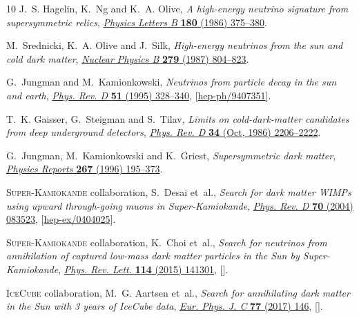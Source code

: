 \documentclass[11pt]{article}
\begin{document}
\begin{thebibliography}{10}
J.~S. Hagelin, K.~Ng and K.~A. Olive, \emph{A high-energy neutrino signature
  from supersymmetric relics},
  \href{https://doi.org/https://doi.org/10.1016/0370-2693(86)91205-0}{\emph{Physics
  Letters B} {\bfseries 180} (1986) 375--380}.

M.~Srednicki, K.~A. Olive and J.~Silk, \emph{High-energy neutrinos from the sun
  and cold dark matter},
  \href{https://doi.org/https://doi.org/10.1016/0550-3213(87)90020-4}{\emph{Nuclear
  Physics B} {\bfseries 279} (1987) 804--823}.

G.~Jungman and M.~Kamionkowski, \emph{{Neutrinos from particle decay in the sun
  and earth}}, \href{https://doi.org/10.1103/PhysRevD.51.328}{\emph{Phys. Rev.
  D} {\bfseries 51} (1995) 328--340},
  [\href{https://arxiv.org/abs/hep-ph/9407351}{{\ttfamily hep-ph/9407351}}].

T.~K. Gaisser, G.~Steigman and S.~Tilav, \emph{Limits on cold-dark-matter
  candidates from deep underground detectors},
  \href{https://doi.org/10.1103/PhysRevD.34.2206}{\emph{Phys. Rev. D}
  {\bfseries 34} (Oct, 1986) 2206--2222}.

G.~Jungman, M.~Kamionkowski and K.~Griest, \emph{Supersymmetric dark matter},
  \href{https://doi.org/https://doi.org/10.1016/0370-1573(95)00058-5}{\emph{Physics
  Reports} {\bfseries 267} (1996) 195--373}.

{\scshape Super-Kamiokande} collaboration, S.~Desai et~al., \emph{{Search for
  dark matter WIMPs using upward through-going muons in Super-Kamiokande}},
  \href{https://doi.org/10.1103/PhysRevD.70.083523}{\emph{Phys. Rev. D}
  {\bfseries 70} (2004) 083523},
  [\href{https://arxiv.org/abs/hep-ex/0404025}{{\ttfamily hep-ex/0404025}}].

{\scshape Super-Kamiokande} collaboration, K.~Choi et~al., \emph{{Search for
  neutrinos from annihilation of captured low-mass dark matter particles in the
  Sun by Super-Kamiokande}},
  \href{https://doi.org/10.1103/PhysRevLett.114.141301}{\emph{Phys. Rev. Lett.}
  {\bfseries 114} (2015) 141301},
  [\href{https://arxiv.org/abs/1503.04858}{{}}].

{\scshape IceCube} collaboration, M.~G. Aartsen et~al., \emph{{Search for
  annihilating dark matter in the Sun with 3 years of IceCube data}},
  \href{https://doi.org/10.1140/epjc/s10052-017-4689-9}{\emph{Eur. Phys. J. C}
  {\bfseries 77} (2017) 146},
  [\href{https://arxiv.org/abs/1612.05949}{{}}].


\end{thebibliography}
\end{document}
